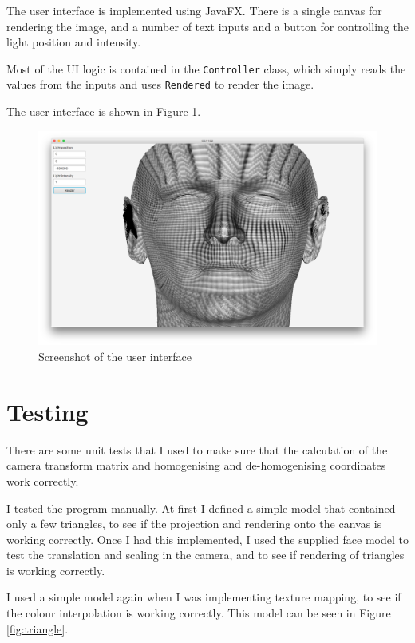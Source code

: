 \documentclass[]{article}
\begin{document}
The user interface is implemented using JavaFX. There is a single canvas for rendering the image, and a number of text inputs and a button for controlling the light position and intensity.

Most of the UI logic is contained in the \texttt{Controller} class, which simply reads the values from the inputs and uses \texttt{Rendered} to render the image.

The user interface is shown in Figure \ref{fig:ui}.

\begin{figure}
  \includegraphics[width=\textwidth]{figures/ui}
  \caption{Screenshot of the user interface}
  \label{fig:ui}
\end{figure}

\section{Testing}

There are some unit tests that I used to make sure that the calculation of the camera transform matrix and homogenising and de-homogenising coordinates work correctly.

I tested the program manually. At first I defined a simple model that contained only a few triangles, to see if the projection and rendering onto the canvas is working correctly. Once I had this implemented, I used the supplied face model to test the translation and scaling in the camera, and to see if rendering of triangles is working correctly.

I used a simple model again when I was implementing texture mapping, to see if the colour interpolation is working correctly. This model can be seen in Figure \ref{fig:triangle}.
\end{document}
